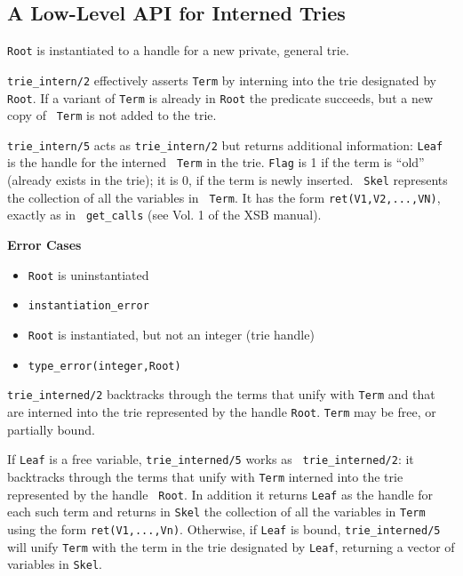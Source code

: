 \subsection{A Low-Level API for Interned Tries} \label{sec:intern-basic}
\begin{description}
 {\tt Root} is
instantiated to a handle for a new private, general trie.


%
% 
{\tt trie\_intern/2} effectively asserts \texttt{Term} by interning
into the trie designated by {\tt Root}.  If a variant of {\tt Term} is
already in {\tt Root} the predicate succeeds, but a new copy of {\tt
  Term} is not added to the trie.

{\tt trie\_intern/5} acts as {\tt trie\_intern/2} but returns
additional information: {\tt Leaf} is the handle for the interned {\tt
  Term} in the trie.  {\tt Flag} is 1 if the term is ``old'' (already
exists in the trie); it is 0, if the term is newly inserted.  {\tt
  Skel} represents the collection of all the variables in {\tt
  Term}. It has the form {\tt ret(V1,V2,...,VN)}, exactly as in {\tt
  get\_calls} (see Vol. 1 of the XSB manual).

{\bf Error Cases}
\begin{itemize}
\item 	{\tt Root} is uninstantiated
\bi
\item 	 {\tt instantiation\_error}
\ei
\item 	{\tt Root} is instantiated, but not an integer (trie handle)
\bi
\item 	 {\tt type\_error(integer,Root)}
\ei
\end{itemize}

{\tt trie\_interned/2} backtracks through the terms that unify with
{\tt Term} and that are interned into the trie represented by the
handle {\tt Root}.  {\tt Term} may be free, or partially bound.

If {\tt Leaf} is a free variable, {\tt trie\_interned/5} works as {\tt
  trie\_interned/2}: it backtracks through the terms that unify with
{\tt Term} interned into the trie represented by the handle {\tt
  Root}.  In addition it returns {\tt Leaf} as the handle for each
such term and returns in {\tt Skel} the collection of all the
variables in {\tt Term} using the form {\tt ret(V1,...,Vn)}.
Otherwise, if {\tt Leaf} is bound, {\tt trie\_interned/5} will unify
{\tt Term} with the term in the trie designated by {\tt Leaf}, 
returning a vector of variables in {\tt Skel}.


\end{description}

